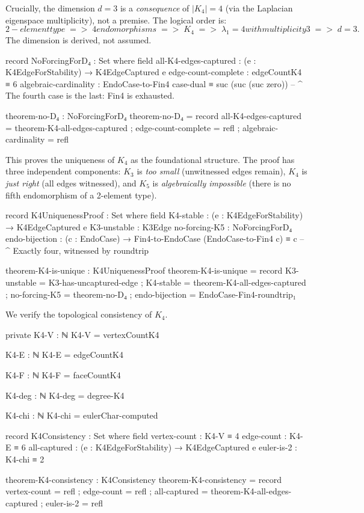 \documentclass[11pt,a4paper]{book}
\def\Rightarrow{=>}%
\def\text#1{#1}%
\begin{document}
Crucially, the dimension $d = 3$ is a \emph{consequence} of $|K_4| = 4$ (via the
Laplacian eigenspace multiplicity), not a premise. The logical order is:
\[
  \text{2-element type} \;\Rightarrow\; 4\text{ endomorphisms} \;\Rightarrow\;
  K_4 \;\Rightarrow\; \lambda_1 = 4\text{ with multiplicity }3 \;\Rightarrow\; d = 3.
\]
The dimension is derived, not assumed.

\begin{code}
record NoForcingForD₄ : Set where
  field
    all-K4-edges-captured : (e : K4EdgeForStability) → K4EdgeCaptured e
    edge-count-complete : edgeCountK4 ≡ 6
    algebraic-cardinality : EndoCase-to-Fin4 case-dual ≡ suc (suc (suc zero))
    -- ^ The fourth case is the last: Fin4 is exhausted.

theorem-no-D₄ : NoForcingForD₄
theorem-no-D₄ = record
  { all-K4-edges-captured = theorem-K4-all-edges-captured
  ; edge-count-complete = refl
  ; algebraic-cardinality = refl
  }

\end{code}

This proves the uniqueness of $K_4$ as the foundational structure. The proof
has three independent components: $K_3$ is \emph{too small} (unwitnessed edges
remain), $K_4$ is \emph{just right} (all edges witnessed), and $K_5$ is
\emph{algebraically impossible} (there is no fifth endomorphism of a 2-element type).

\begin{code}
record K4UniquenessProof : Set where
  field
    K4-stable     : (e : K4EdgeForStability) → K4EdgeCaptured e
    K3-unstable   : K3Edge
    no-forcing-K5 : NoForcingForD₄
    endo-bijection : (c : EndoCase) → Fin4-to-EndoCase (EndoCase-to-Fin4 c) ≡ c
    -- ^ Exactly four, witnessed by roundtrip

theorem-K4-is-unique : K4UniquenessProof
theorem-K4-is-unique = record
  { K3-unstable = K3-has-uncaptured-edge
  ; K4-stable = theorem-K4-all-edges-captured
  ; no-forcing-K5 = theorem-no-D₄
  ; endo-bijection = EndoCase-Fin4-roundtrip₁
  }
\end{code}

We verify the topological consistency of $K_4$.

\begin{code}
private
  K4-V : ℕ
  K4-V = vertexCountK4

  K4-E : ℕ
  K4-E = edgeCountK4

  K4-F : ℕ
  K4-F = faceCountK4

  K4-deg : ℕ
  K4-deg = degree-K4

  K4-chi : ℕ
  K4-chi = eulerChar-computed

record K4Consistency : Set where
  field
    vertex-count     : K4-V ≡ 4
    edge-count       : K4-E ≡ 6
    all-captured     : (e : K4EdgeForStability) → K4EdgeCaptured e
    euler-is-2       : K4-chi ≡ 2

theorem-K4-consistency : K4Consistency
theorem-K4-consistency = record
  { vertex-count = refl
  ; edge-count   = refl
  ; all-captured = theorem-K4-all-edges-captured
  ; euler-is-2   = refl
  }
\end{code}
\end{document}
